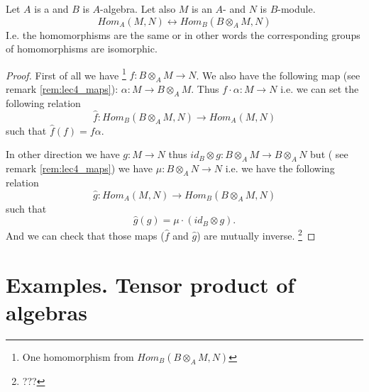 \begin{theorem}
  Let $A$ is a  and $B$ is $A$-algebra. Let also $M$
  is an $A$- and $N$ is $B$-module.
  \[
  Hom_A\left(M, N\right)
  \leftrightarrow
  Hom_B\left(B \otimes_A M, N\right)
  \]
  I.e. the homomorphisms are the same or in other words the
  corresponding groups of homomorphisms are isomorphic. 
  \begin{proof}
    First of all we have
    \footnote{
      One homomorphism from  $Hom_B\left(B \otimes_A M, N\right)$
    }
     $f: B \otimes_A M \to N$. We also have
    the following map (see remark \ref{rem:lec4_maps}):
    $\alpha: M \to B \otimes_A M$. 
    Thus $f \cdot \alpha: M \to N$ i.e.
    we can set the following relation
    \[
    \hat{f} : Hom_B\left(B \otimes_A M, N\right)
    \to Hom_A\left(M, N\right)
    \]
    such that $\hat{f}\left(f\right) = f \alpha$.

    In other direction we have $g: M \to N$ thus
    $id_B \otimes g: B \otimes_A M \to B \otimes_A N$ but
    ( see remark \ref{rem:lec4_maps}) we have
    $\mu: B \otimes_A N \to N$ i.e. we have the following relation
    \[
    \hat{g} : Hom_A\left(M, N\right) \to
    Hom_B\left(B \otimes_A M, N\right)
    \]
    such that
    \[
    \hat g(g) = \mu \cdot (id_B \otimes g).
    \]   
    And we can check that those maps ($\hat{f}$ and $\hat{g}$) are
    mutually inverse. 
    \footnote{
      ???
    }
  \end{proof}
  \label{thm:basechange}
\end{theorem}

\section{Examples. Tensor product of algebras}

